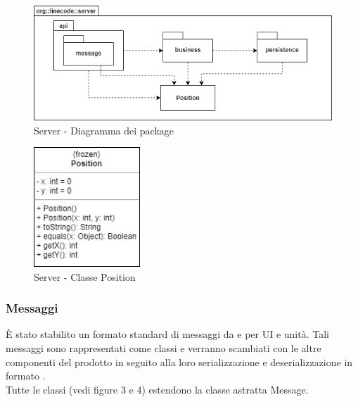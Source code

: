 	\begin{figure}[H]
		\centering
		\includegraphics[width=12cm]{img/server_package.png}
		\caption{Server - Diagramma dei package}
	\end{figure}
	
	\begin{figure}[H]
		\centering
		\includegraphics[width=4cm]{img/class_position.png}
		\caption{Server - Classe Position}
	\end{figure}

	\subsubsection{Messaggi}
		È stato stabilito un formato standard di messaggi da e per UI e unità. Tali messaggi sono rappresentati come classi  e verranno scambiati con le altre componenti del prodotto in seguito alla loro serializzazione e deserializzazione in formato .\\
		Tutte le classi (vedi figure 3 e 4) estendono la classe astratta Message.
	
